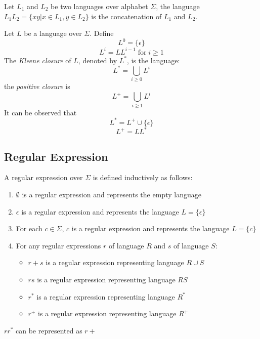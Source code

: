 \begin{defn}[Concatenation]
  Let $L_1$ and $L_2$ be two languages over alphabet $\Sigma$, the
  language $L_1 L_2 = \{x y | x \in L_1, y \in L_2 \}$ is the
  concatenation of $L_1$ and $L_2$.
\end{defn}

\begin{defn}
  Let $L$ be a language over $\Sigma$. Define 
  $$L^0 = \{ \epsilon \}$$
  $$L^i = L L^{i-1} \; \textrm{for} \; i \ge 1$$
  The \emph{Kleene closure} of $L$, denoted by $L^*$, is the language:
  $$ L^* = \bigcup_{i \ge 0} L^i $$
  the \emph{positive closure} is
  $$ L^+ = \bigcup_{i \ge 1} L^i $$
  It can be observed that
  $$ L^* = L^+ \cup \{ \epsilon \} $$
  $$ L^+ = L L^* $$
\end{defn}

\subsection{Regular Expression}

\begin{defn}
  A regular expression over $\Sigma$ is defined inductively as follows:
  \begin{enumerate}
  \item $\emptyset$ is a regular expression and represents the empty language
  \item $\epsilon$ is a regular expression and represents the language
    $L = \{ \epsilon \}$
  \item For each $c \in \Sigma$, $c$ is a regular expression and
    represents the language $L = \{ c \}$
  \item For any regular expressions $r$ of language $R$ and $s$ of language $S$:
    \begin{itemize}
    \item $r+s$ is a regular expression representing language $R \cup S$
    \item $r s$ is a regular expression representing language $R S$
    \item $r^*$ is a regular expression representing language $R^*$
    \item $r^+$ is a regular expression representing language $R^+$
    \end{itemize}
  \end{enumerate}
\end{defn}

\begin{thm}
  $r r^*$ can be represented as $r+$
\end{thm}

